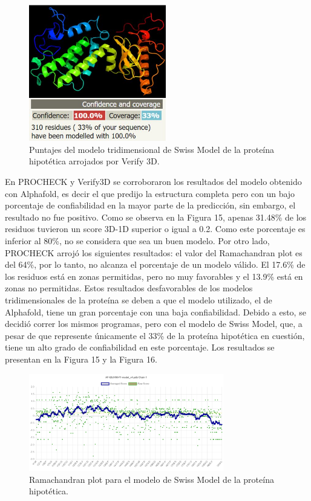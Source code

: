 \documentclass[journal,transmag]{IEEEtran}
\begin{document}
\begin{figure}[!h]
	\center
	\includegraphics[width=6cm]{imagenes/phyre.JPG}
\caption{Puntajes del modelo tridimensional de Swiss Model de la proteína hipotética arrojados por Verify 3D. }
	\label{15}
\end{figure}


En PROCHECK y Verify3D se corroboraron los resultados del modelo obtenido con Alphafold, es decir el que predijo la estructura completa pero con un bajo porcentaje de confiabilidad en la mayor parte de la predicción, sin embargo, el resultado no fue positivo. Como se observa en la Figura 15, apenas 31.48\% de los residuos tuvieron un score 3D-1D superior o igual a 0.2. Como este porcentaje es inferior al 80\%, no se considera que sea un buen modelo. 
Por otro lado, PROCHECK arrojó los siguientes resultados: el valor del Ramachandran plot es del 64\%, por lo tanto, no alcanza   el porcentaje de un modelo válido. El 17.6\% de los residuos está en zonas permitidas, pero no muy favorables y el 13.9\% está en zonas no permitidas.
Estos resultados desfavorables de los modelos tridimensionales de la proteína se deben a que el modelo utilizado, el de Alphafold, tiene un gran porcentaje con una baja confiabilidad.  Debido a esto, se decidió correr los mismos programas, pero con el modelo de Swiss Model, que, a pesar de que represente únicamente el 33\% de la proteína hipotética en cuestión, tiene un alto grado de confiabilidad en este porcentaje. Los resultados se presentan en la Figura 15 y la Figura 16. 



\begin{figure}[!h]
	\center
	\includegraphics[width=8.5cm]{imagenes/procheck.png}
	\caption{Ramachandran plot para el modelo de Swiss Model de la proteína hipotética. }
	\label{16}
\end{figure}
\end{document}
